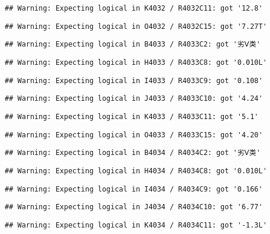 \documentclass[
]{article}
\begin{document}
\begin{verbatim}
## Warning: Expecting logical in K4032 / R4032C11: got '12.8'
\end{verbatim}

\begin{verbatim}
## Warning: Expecting logical in O4032 / R4032C15: got '7.27T'
\end{verbatim}

\begin{verbatim}
## Warning: Expecting logical in B4033 / R4033C2: got '劣Ⅴ类'
\end{verbatim}

\begin{verbatim}
## Warning: Expecting logical in H4033 / R4033C8: got '0.010L'
\end{verbatim}

\begin{verbatim}
## Warning: Expecting logical in I4033 / R4033C9: got '0.108'
\end{verbatim}

\begin{verbatim}
## Warning: Expecting logical in J4033 / R4033C10: got '4.24'
\end{verbatim}

\begin{verbatim}
## Warning: Expecting logical in K4033 / R4033C11: got '5.1'
\end{verbatim}

\begin{verbatim}
## Warning: Expecting logical in O4033 / R4033C15: got '4.20'
\end{verbatim}

\begin{verbatim}
## Warning: Expecting logical in B4034 / R4034C2: got '劣Ⅴ类'
\end{verbatim}

\begin{verbatim}
## Warning: Expecting logical in H4034 / R4034C8: got '0.010L'
\end{verbatim}

\begin{verbatim}
## Warning: Expecting logical in I4034 / R4034C9: got '0.166'
\end{verbatim}

\begin{verbatim}
## Warning: Expecting logical in J4034 / R4034C10: got '6.77'
\end{verbatim}

\begin{verbatim}
## Warning: Expecting logical in K4034 / R4034C11: got '-1.3L'
\end{verbatim}
\end{document}
